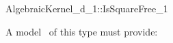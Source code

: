 \begin{ccRefConcept}{AlgebraicKernel_d_1::IsSquareFree_1}


A model \ccVar\ of this type must provide:

{}

\ccSeeAlso

\end{ccRefConcept}
